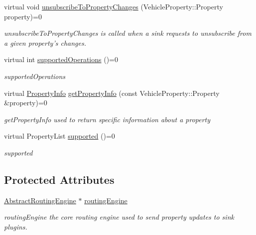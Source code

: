 \begin{DoxyCompactItemize}
virtual void \hyperlink{classAbstractSource_a584372310f191b1b9067a634b7366023}{unsubscribe\+To\+Property\+Changes} (Vehicle\+Property\+::\+Property property)=0
\begin{DoxyCompactList}\small\item\em unsubscribe\+To\+Property\+Changes is called when a sink requests to unsubscribe from a given property's changes. \end{DoxyCompactList}\item 
virtual int \hyperlink{classAbstractSource_a317861675652372a72fc01c075036b51}{supported\+Operations} ()=0
\begin{DoxyCompactList}\small\item\em supported\+Operations \end{DoxyCompactList}\item 
virtual \hyperlink{classPropertyInfo}{Property\+Info} \hyperlink{classAbstractSource_a4e15ea9df2144be322968003621580c4}{get\+Property\+Info} (const Vehicle\+Property\+::\+Property \&property)=0
\begin{DoxyCompactList}\small\item\em get\+Property\+Info used to return specific information about a property \end{DoxyCompactList}\item 
virtual Property\+List \hyperlink{classAbstractSource_ad8330cbbac84dc24851eb50ff7243460}{supported} ()=0
\begin{DoxyCompactList}\small\item\em supported \end{DoxyCompactList}\end{DoxyCompactItemize}
\subsection*{Protected Attributes}
\begin{DoxyCompactItemize}
\item 
\hyperlink{classAbstractRoutingEngine}{Abstract\+Routing\+Engine} $\ast$ \hyperlink{classAbstractSource_aabbce93fea123c54be55a007c928a6f1}{routing\+Engine}
\begin{DoxyCompactList}\small\item\em routing\+Engine the core routing engine used to send property updates to sink plugins. \end{DoxyCompactList}\end{DoxyCompactItemize}



